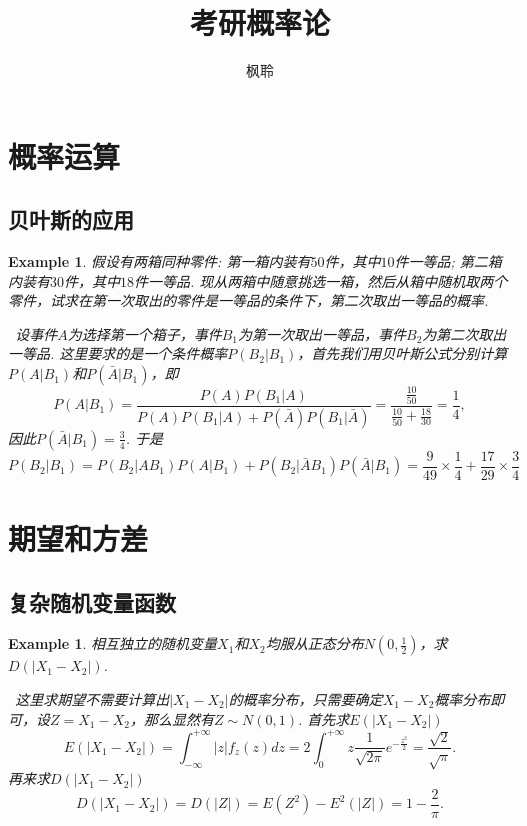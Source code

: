 \documentclass{article}
\newtheorem{example}[theorem]{Example}
\newcommand{\hints}{{\color{blue} \text{hints}}}
\begin{document}
\title{考研概率论}
\author{枫聆}
\maketitle

\tableofcontents

\newpage
\section{概率运算}

\subsection{贝叶斯的应用}

\begin{example}
\rm 假设有两箱同种零件: 第一箱内装有$50$件，其中$10$件一等品; 第二箱内装有$30$件，其中$18$件一等品. 现从两箱中随意挑选一箱，然后从箱中随机取两个零件，试求在第一次取出的零件是一等品的条件下，第二次取出一等品的概率.

\hints\ 设事件$A$为选择第一个箱子，事件$B_1$为第一次取出一等品，事件$B_2$为第二次取出一等品. 这里要求的是一个条件概率$P(B_2|B_1)$，首先我们用贝叶斯公式分别计算$P(A|B_1)$和$P(\bar{A}|B_1)$，即
$$
P(A|B_1) = \frac{P(A)P(B_1|A)}{P(A)P(B_1|A) + P(\bar{A})P(B_1|\bar{A})} = \frac{\frac{10}{50}}{\frac{10}{50} + \frac{18}{30}} = \frac{1}{4},
$$ 
因此$P(\bar{A}|B_1) = \frac{3}{4}$. 于是
$$
P(B_2|B_1) = P(B_2|AB_1)P(A|B_1) + P(B_2|\bar{A}B_1)P(\bar{A}|B_1) = \frac{9}{49}\times\frac{1}{4} + \frac{17}{29} \times \frac{3}{4}
$$
\end{example}

\newpage
\section{期望和方差}

\subsection{复杂随机变量函数}

\begin{example}
\rm 相互独立的随机变量$X_1$和$X_2$均服从正态分布$N(0,\frac{1}{2})$，求$D(|X_1 - X_2|)$. 

\hints\ 这里求期望不需要计算出$|X_1-X_2|$的概率分布，只需要确定$X_1 - X_2$概率分布即可，设$Z= X_1 - X_2$，那么显然有$Z \sim N(0,1)$. 首先求$E(|X_1-X_2|)$
$$
E(|X_1-X_2|) = \int_{-\infty}^{+\infty} |z|f_z(z)dz = 2\int_0^{+\infty} z\frac{1}{\sqrt{2\pi}}e^{-\frac{z^2}{2}} = \frac{\sqrt{2}}{\sqrt{\pi}}.
$$
再来求$D(|X_1 - X_2|)$
$$
D(|X_1 - X_2|) = D(|Z|) = E(Z^2) - E^2(|Z|) = 1-\frac{2}{\pi}.
$$
\end{example}
\end{document}
